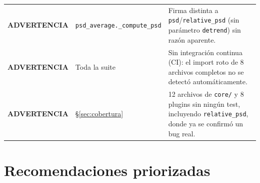 \documentclass[11pt,a4paper]{article}
\newcommand{\warnmark}{\textcolor{advertencia}{\textbf{ADVERTENCIA}}}
\begin{document}
\begin{center}
\begin{longtable}{L{1.6cm}L{4.3cm}L{8.3cm}}
\warnmark & \texttt{psd\_\allowbreak average.\_\allowbreak compute\_\allowbreak psd} & Firma distinta a \texttt{psd}/\texttt{relative\_\allowbreak psd} (sin parámetro \texttt{detrend}) sin razón aparente. \\
\warnmark & Toda la suite & Sin integración continua (CI): el import roto de 8 archivos completos no se detectó automáticamente. \\
\warnmark & \S\ref{sec:cobertura} & 12 archivos de \texttt{core/} y 8 plugins sin ningún test, incluyendo \texttt{relative\_\allowbreak psd}, donde ya se confirmó un bug real. \\
\bottomrule
\end{longtable}
\end{center}

\section{Recomendaciones priorizadas}
\end{document}
